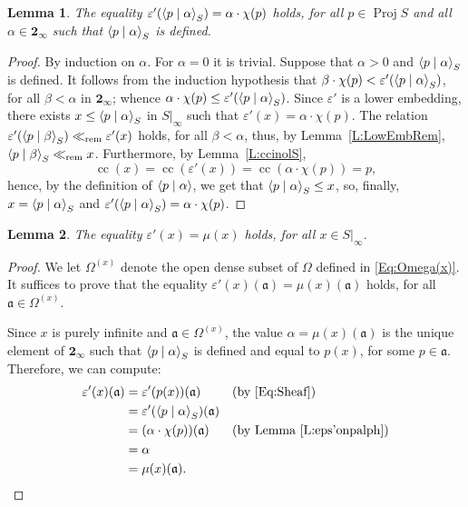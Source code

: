 \documentclass[psamsfonts,reqno]{memo-l}
\theoremstyle{plain}
\newtheorem{lemma}{Lemma}[section]
\theoremstyle{definition}
\theoremstyle{remark}
\numberwithin{equation}{section}
\newcommand{\Cn}{\mathbf{2}_{\infty}}
\newcommand{\eps}{\varepsilon}
\newcommand{\rem}{\ll_{\mathrm{rem}}}
\newcommand{\scal}[2]{\left\langle\nobreak#1\nobreak\mid\nobreak#2
\nobreak\right\rangle}
\newcommand{\DI}[1]{#1|_{\infty}}
\newcommand{\fa}{\mathfrak{a}}
\DeclareMathOperator{\cc}{cc}
\DeclareMathOperator{\BB}{Proj}
\begin{document}
\begin{lemma}\label{L:eps'onpalph}
The equality $\eps'(\scal{p}{\alpha}_S)=\alpha\cdot\chi(p)$ holds, for
all\index{pzzroj@$\BB{S}$}
$p\in\BB S$ and all $\alpha\in\Cn$ such that $\scal{p}{\alpha}_S$ is defined.
\end{lemma}

\begin{proof}
By induction on $\alpha$. For $\alpha=0$ it is trivial. Suppose that
$\alpha>0$ and $\scal{p}{\alpha}_S$ is defined. It follows from the induction
hypothesis that $\beta\cdot\chi(p)<\eps'(\scal{p}{\alpha}_S)$, for all
$\beta<\alpha$ in $\Cn$; whence
$\alpha\cdot\chi(p)\leq\eps'(\scal{p}{\alpha}_S)$. Since $\eps'$ is a lower
embedding, there exists $x\leq\scal{p}{\alpha}_S$ in
$\DI{S}$ such that
$\eps'(x)=\alpha\cdot\chi(p)$. The relation
$\eps'(\scal{p}{\beta}_S)\rem\eps'(x)$ holds, for all $\beta<\alpha$, thus, by
Lemma~\ref{L:LowEmbRem}, $\scal{p}{\beta}_S\rem x$. Furthermore, by
Lemma~\ref{L:ccinolS},
   \[
   \cc(x)=\cc(\eps'(x))=\cc(\alpha\cdot\chi(p))=p,
   \]
hence, by the definition of $\scal{p}{\alpha}$, we get that
$\scal{p}{\alpha}_S\leq x$, so, finally, $x=\scal{p}{\alpha}_S$ and
$\eps'(\scal{p}{\alpha}_S)=\alpha\cdot\chi(p)$.
\end{proof}

\begin{lemma}\label{L:eps'=muDI}
The equality $\eps'(x)=\mu(x)$ holds, for all $x\in\DI{S}$.
\end{lemma}

\begin{proof}
We let $\Omega^{(x)}$ denote the open dense subset of $\Omega$ defined in
\eqref{Eq:Omega(x)}. It suffices to prove that the equality
$\eps'(x)(\fa)=\mu(x)(\fa)$ holds, for all $\fa\in\Omega^{(x)}$.

Since $x$ is purely infinite and $\fa\in\Omega^{(x)}$, the value
$\alpha=\mu(x)(\fa)$ is the unique element of $\Cn$ such that
$\scal{p}{\alpha}_S$ is defined and equal to $p(x)$, for some $p\in\fa$.
Therefore, we can compute:
   \begin{align*}
   \eps'(x)(\fa)&=\eps'(p(x))(\fa)&&(\text{by \eqref{Eq:Sheaf}})\\
   &=\eps'(\scal{p}{\alpha}_S)(\fa)\\
   &=(\alpha\cdot\chi(p))(\fa)&&(\text{by Lemma~\ref{L:eps'onpalph}})\\
   &=\alpha\\
   &=\mu(x)(\fa).\tag*{\qed}
   \end{align*}
\renewcommand{\qed}{}
\end{proof}
\end{document}
